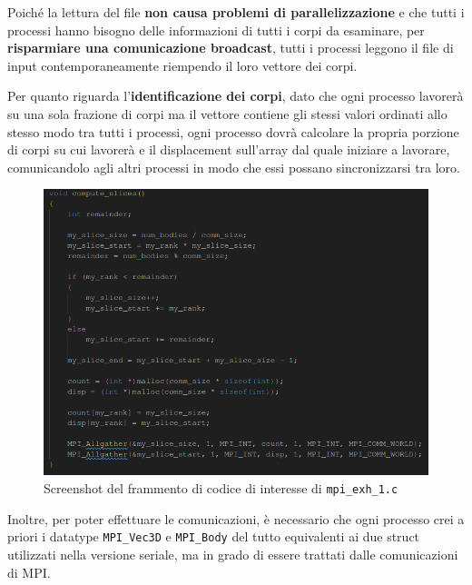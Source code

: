 \documentclass[12pt]{report}
\begin{document}
    Poiché la lettura del file \textbf{non causa problemi di parallelizzazione} e che tutti i processi hanno bisogno delle informazioni di tutti i corpi da esaminare, per \textbf{risparmiare una comunicazione broadcast}, tutti i processi leggono il file di input contemporaneamente riempendo il loro vettore dei corpi. 

    \newpage

    Per quanto riguarda l'\textbf{identificazione dei corpi}, dato che ogni processo lavorerà su una sola frazione di corpi ma il vettore contiene gli stessi valori ordinati allo stesso modo tra tutti i processi, ogni processo dovrà calcolare la propria porzione di corpi su cui lavorerà e il displacement sull'array dal quale iniziare a lavorare, comunicandolo agli altri processi in modo che essi possano sincronizzarsi tra loro.

    \begin{figure}[H]
        \centering
        \includegraphics[width=\textwidth]{images/mpi_exh_1_1.png}
        \caption{Screenshot del frammento di codice di interesse di \texttt{mpi\_exh\_1.c}}
        \label{fig:mpi_exh_1_1}
    \end{figure}

    Inoltre, per poter effettuare le comunicazioni, è necessario che ogni processo crei a priori i datatype \texttt{MPI\_Vec3D} e \texttt{MPI\_Body} del tutto equivalenti ai due struct utilizzati nella versione seriale, ma in grado di essere trattati dalle comunicazioni di MPI. 
\end{document}
